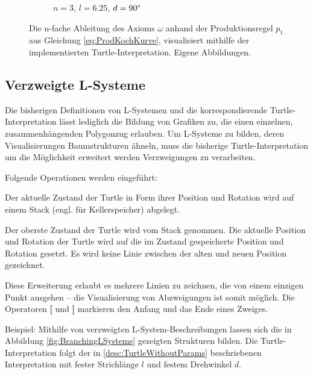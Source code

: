 \begin{figure} [hbtp]
\begin{subfigure}[t]{.4\textwidth}
		\caption{$n=3$, $l=6.25$, $d=90\degree$}
		\label{fig:KochkurveN3L6_25}
	\end{subfigure}
	\caption{Die n-fache Ableitung des Axioms $\omega$ anhand der Produktionsregel $p_1$ aus Gleichung \ref{eq:ProdKochKurve}, visualisiert mithilfe der implementierten Turtle-Interpretation. Eigene Abbildungen.}
	\label{fig:KochkurveAbleitung}
\end{figure}

\subsection{Verzweigte L-Systeme} \label{subsec:BranchingLSystems}

Die bisherigen Definitionen von L-Systemen und die korrespondierende Turtle-Interpretation lässt lediglich die Bildung von Grafiken zu, die einen einzelnen, zusammenhängenden Polygonzug erlauben. Um L-Systeme zu bilden, deren Visualisierungen Baumstrukturen ähneln, muss die bisherige Turtle-Interpretation um die Möglichkeit erweitert werden Verzweigungen zu verarbeiten. \cite[S.24]{ABOP:04} 

Folgende Operationen werden eingeführt:

\begin{description}[labelindent]
	\item[\textbf{[}] Der aktuelle Zustand der Turtle in Form ihrer Position und Rotation wird auf einem Stack (engl. für Kellerspeicher) abgelegt. \cite[S.24]{ABOP:04} \\
	
	\item[\textbf{]}] Der oberste Zustand der Turtle wird vom Stack genommen. Die aktuelle Position und Rotation der Turtle wird auf die im Zustand gespeicherte Position und Rotation gesetzt. Es wird keine Linie zwischen der alten und neuen Position gezeichnet. \cite[S.24]{ABOP:04} 
\end{description}

Diese Erweiterung erlaubt es mehrere Linien zu zeichnen, die von einem einzigen Punkt ausgehen -- die Visualisierung von Abzweigungen ist somit möglich. Die Operatoren \textbf{[} und \textbf{]} markieren den Anfang und das Ende eines Zweiges. \cite[S.24]{ABOP:04} 

Beispiel: Mithilfe von verzweigten L-System-Beschreibungen lassen sich die in Abbildung \ref{fig:BranchingLSystems} gezeigten Strukturen bilden. Die Turtle-Interpretation folgt der in \ref{desc:TurtleWithoutParams} beschriebenen Interpretation mit fester Strichlänge $l$ und festem Drehwinkel $d$.

